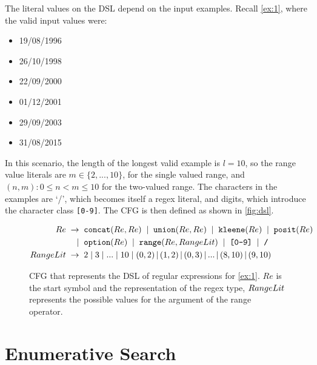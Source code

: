 \begin{example}\label{ex:dsl}
The literal values on the DSL depend on the input examples.
Recall \autoref{ex:1}, where the valid input values were:

\begin{multicols}{3}
    \begin{itemize}[label={}]
    \item 19/08/1996
    \item 26/10/1998
    \item 22/09/2000
    \item 01/12/2001
    \item 29/09/2003
    \item 31/08/2015
    \end{itemize}
\end{multicols}

\noindent
In this scenario, the length of the longest valid example is \(l = 10\), so the range value literals are \(m \in \{2, ..., 10\}\), for the single valued range, and \((n, m): 0 \leq n < m \leq 10\) for the two-valued range. The characters in the examples are `/', which becomes itself a regex literal, and digits, which introduce the character class \texttt{[0-9]}. The \ac{CFG} is then defined as shown in \autoref{fig:dsl}.
%
\end{example}
\begin{figure}[t]
  \begin{align*}
    Re \;\to \;\;&  \texttt{concat}(Re, Re) \;\;|\;\;  \texttt{union}(Re, Re)   \;\;|\;\;  \texttt{kleene}(Re) \;\;|\;\;  \texttt{posit}(Re) \\
          |\;\;&  \texttt{option}(Re) \;\;|\;\;  \texttt{range}(Re, RangeLit) \;\;|\;\; \texttt{[0-9]} \;\;|\;\; \texttt{/}\\
    RangeLit \;\to \;\;&  2 \;|\; 3 \;|\; ... \;|\; 10 \;|\; (0,2) \,|\, (1,2)\,|\, (0,3) \,|\, ... \,|\, (8,10)\,|\, (9,10)
  \end{align*}
  \captionsetup{belowskip=-7pt, aboveskip=-5pt}
  \caption{\ac{CFG} that represents the \ac{DSL} of regular expressions for \autoref{ex:1}. \(Re\) is the start symbol and the representation of the regex type, \(RangeLit{}\) represents the possible values for the argument of the range operator.}
  \label{fig:dsl}
\end{figure}



\section{Enumerative Search}\label{sec:enumeration}

